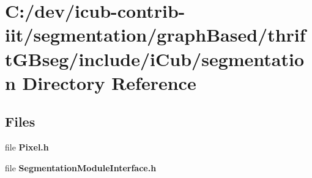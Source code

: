 \section{C\+:/dev/icub-\/contrib-\/iit/segmentation/graph\+Based/thrift\+G\+Bseg/include/i\+Cub/segmentation Directory Reference}
\label{dir_9e9d575fed5e69c17d1b236de0577146}
\subsection*{Files}
\begin{DoxyCompactItemize}
\item 
file {\bfseries Pixel.\+h}
\item 
file {\bfseries Segmentation\+Module\+Interface.\+h}
\end{DoxyCompactItemize}
